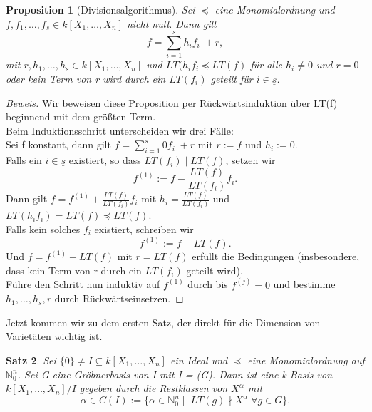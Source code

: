 \documentclass{article}
\newtheorem{satz}{Satz}
\newtheorem{proposition}[satz]{Proposition}
\newcommand*{\R}{k[X_{1},\ldots,X_{n}]}
\begin{document}
	\begin{proposition}[Divisionsalgorithmus] \label{1.2.5}
	Sei \(\preceq\) eine Monomialordnung und \(f, f_{1}, \ldots, f_{s} \in \R\) nicht null. Dann
	gilt \begin{displaymath} f = \sum_{i=1}^{s} h_{i}f_{i}\; + r, \end{displaymath} mit
	\(r, h_{1}, \ldots, h_{s} \in \R\) und \(LT(h_{i}f_{i} \preceq LT(f)\) für alle \(h_{i} \neq 0
	\) und \(r = 0\) oder kein Term von r wird durch ein \(LT(f_{i})\) geteilt für \(i \in
	\underline{s}\).
	\end{proposition}

	\begin{proof}[Beweis]
	Wir beweisen diese Proposition per Rückwärtsinduktion über LT(f) beginnend mit dem größten Term.\\
	Beim Induktionsschritt unterscheiden wir drei Fälle:\\
	Sei f konstant, dann gilt \(f = \sum_{i=1}^{s} 0f_{i}\; + r\) mit \(r := f\) und \(h_{i} := 0\). \\
	Falls ein \(i \in \underline{s}\) existiert, so dass \(LT(f_{i})\;| \; LT(f)\), setzen wir
	\begin{displaymath} f^{(1)} := f - \frac{LT(f)}{LT(f_{i})}f_{i}.\end{displaymath} Dann gilt
	\( f = f^{(1)} + \frac{LT(f)}{LT(f_{i})}f_{i} \) mit \(h_{i} = \frac{LT(f)}{LT(f_{i})}\) und 
	\(LT(h_{i}f_{i}) = LT(f) \preceq LT(f).\) \\
	Falls kein solches \(f_{i}\) existiert, schreiben wir \begin{displaymath} f^{(1)} := f -
	LT(f). \end{displaymath} Und \(f = f^{(1)} + LT(f)\) mit \(r = LT(f)\) erfüllt die Bedingungen 
	(insbesondere, dass kein Term von r durch ein \(LT(f_{i})\) geteilt wird). \\
	Führe den Schritt nun induktiv auf \(f^{(1)}\) durch bis \(f^{(j)} = 0\) und bestimme
	\(h_{1}, \ldots, h_{s}, r\) durch Rückwärtseinsetzen.
	\end{proof}


	Jetzt kommen wir zu dem ersten Satz, der direkt für die Dimension von Varietäten wichtig ist.


	\begin{satz} \label{1.2.8}
	Sei \(\{0\} \neq I \subseteq \R\) ein Ideal und \(\preceq\) eine Monomialordnung auf
	\(\mathbb{N}^{n}_{0}\). Sei G eine Gröbnerbasis von I mit I = (G). Dann ist eine k-Basis von 
	\(\R/I\) gegeben durch die Restklassen von \(X^{\alpha}\) mit
	\begin{displaymath}
	\alpha \in C(I) := \{\alpha \in \mathbb{N}^{n}_{0}\; |\;\; LT(g) \nmid X^{\alpha}\; \forall g 
	\in G\}.
	\end{displaymath}
	\end{satz}
\end{document}
